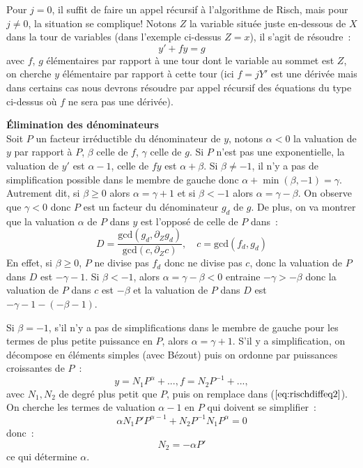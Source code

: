 \documentclass[a4paper,11pt]{book}
\begin{document}
\begin{giacjshere}
Pour $j=0$, il suffit de faire un appel récursif à l'algorithme de Risch,
mais pour $j\neq 0$, la situation se complique!
Notons $Z$ la variable situ\'ee juste en-dessous de $X$ dans la tour
de variables (dans l'exemple ci-dessus $Z=x$), il s'agit de r\'esoudre~: 
\begin{equation} \label{eq:rischdiffeq2}
y'+f y=g
\end{equation}
avec $f$, $g$ \'el\'ementaires par rapport \`a une tour dont le
variable au sommet est $Z$, on cherche $y$ \'el\'ementaire par rapport
\`a cette tour (ici $f=jY'$ est une d\'eriv\'ee mais dans certains
cas nous devrons r\'esoudre par appel r\'ecursif des \'equations
du type ci-dessus o\`u $f$ ne sera pas une d\'eriv\'ee).

{\bf \'Elimination des d\'enominateurs}\\
Soit $P$ un facteur irréductible du d\'enominateur de $y$, notons 
$\alpha<0$ la valuation de $y$ par rapport \`a $P$, 
$\beta$ celle de $f$, $\gamma$ celle de $g$. 
Si $P$ n'est pas une exponentielle,
la valuation de $y'$ est $\alpha-1$, celle de $ f y $ est $\alpha +\beta $. 
Si $\beta \neq -1$, 
il n'y a pas de simplification possible dans le membre de gauche
donc $\alpha + \min(\beta,-1) =\gamma$. Autrement dit, si 
$\beta \geq 0$ alors $\alpha=\gamma+1$ et si $\beta<-1$ 
alors $\alpha=\gamma-\beta$.
On observe que $\gamma<0$ donc
$P$ est un facteur du d\'enominateur $g_d$ de $g$. De plus, on va montrer
que la valuation $\alpha$ de $P$ dans $y$ est l'oppos\'e de celle
de $P$ dans~:
\begin{equation} \label{eq:defD}
D=\frac{\mbox{gcd}(g_d,\partial_Z g_d)}{\mbox{gcd}(c,\partial_Z c)}, 
\quad c=\mbox{gcd}(f_d,g_d)
\end{equation}
En effet, si $\beta \geq 0$, $P$ ne divise pas $f_d$ donc ne divise
pas $c$, donc la valuation de $P$ dans $D$ est $-\gamma-1$. Si $\beta < -1$,
alors $\alpha=\gamma - \beta <0$ entraine $-\gamma > -\beta$ donc la
valuation de $P$ dans $c$ est $-\beta$ et la valuation de $P$ dans $D$
est $-\gamma-1 - (-\beta-1)$.

Si $\beta=-1$, s'il n'y a pas de simplifications dans le membre
de gauche pour les termes de plus petite puissance en $P$, alors 
$\alpha=\gamma+1$. S'il y a simplification,
on d\'ecompose en \'el\'ements
simples (avec B\'ezout) puis on ordonne par puissances croissantes
de $P$~:
\[y= N_1 P^\alpha +..., f= N_2 P^{-1}+...,\]
avec $N_1,N_2$ de degré plus petit que $P$, puis on remplace dans 
(\(\ref{eq:rischdiffeq2}\)). On cherche les termes de valuation $\alpha-1$
en $P$ qui doivent se simplifier~:
\[ \alpha N_1 P' P^{\alpha-1} + N_2 P^{-1} N_1 P^\alpha =0 \]
donc~:
\[ N_2 = -\alpha P' \]
ce qui d\'etermine $\alpha$.


\end{giacjshere}
\end{document}

